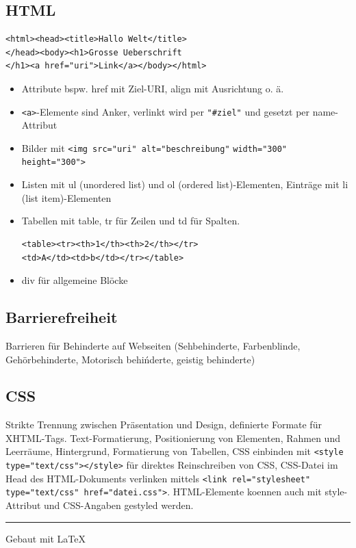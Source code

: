 \documentclass[12pt,landscape]{article}
\begin{document}
\begin{multicols}{3}
\subsection{HTML}
\begin{lstlisting}
<html><head><title>Hallo Welt</title>
</head><body><h1>Grosse Ueberschrift
</h1><a href="uri">Link</a></body></html>
\end{lstlisting}
\begin{itemize}
\item Attribute bspw. href mit Ziel-URI, align mit Ausrichtung o. ä.
\item \lstinline|<a>|-Elemente sind Anker, verlinkt wird per \lstinline|"#ziel"| und gesetzt per name-Attribut
\item Bilder mit
\lstinline|<img src="uri" alt="beschreibung"|
\lstinline|width="300" height="300">|
\item Listen mit ul (unordered list) und ol (ordered list)-Elementen, Einträge mit li (list item)-Elementen
\item Tabellen mit table, tr für Zeilen und td für Spalten.
\begin{lstlisting}
<table><tr><th>1</th><th>2</th></tr>
<td>A</td><td>b</td></tr></table>
\end{lstlisting}
\item div für allgemeine Blöcke
\end{itemize}
\subsection{Barrierefreiheit}
Barrieren für Behinderte auf Webseiten (Sehbehinderte, Farbenblinde, Gehörbehinderte, Motorisch behińderte, geistig behinderte)
\subsection{CSS}
Strikte Trennung zwischen Präsentation und Design, definierte Formate für XHTML-Tags. Text-Formatierung, Positionierung von Elementen, Rahmen und Leerräume, Hintergrund, Formatierung von Tabellen, CSS einbinden mit \lstinline|<style type="text/css"></style>| für direktes Reinschreiben von CSS, CSS-Datei im Head des HTML-Dokuments verlinken mittels \lstinline|<link rel="stylesheet"| \lstinline|type="text/css" href="datei.css">|. HTML-Elemente koennen auch mit style-Attribut und CSS-Angaben gestyled werden.
\rule{0.3\linewidth}{0.25pt}
\scriptsize

Gebaut mit \LaTeX

\end{multicols}
\end{document}
